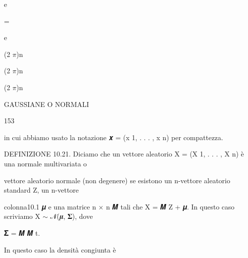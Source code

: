 \documentclass[a4paper,portrait,12pt]{article}
\begin{document}
\begin{flushleft}
e
\end{flushleft}


=


\begin{flushleft}
e
\end{flushleft}


\begin{flushleft}
(2 $\pi$)n
\end{flushleft}


\begin{flushleft}
(2 $\pi$)n
\end{flushleft}


\begin{flushleft}
(2 $\pi$)n
\end{flushleft}





\begin{flushleft}
 GAUSSIANE O NORMALI
\end{flushleft}





153





\begin{flushleft}
in cui abbiamo usato la notazione 𝒙 = (x 1, . . . , x n) per compattezza.
\end{flushleft}


\begin{flushleft}
DEFINIZIONE 10.21. Diciamo che un vettore aleatorio X = (X 1, . . . , X n) \`{e} una normale multivariata o
\end{flushleft}


\begin{flushleft}
vettore aleatorio normale (non degenere) se esistono un n-vettore aleatorio standard Z, un n-vettore
\end{flushleft}


\begin{flushleft}
colonna10.1 𝝁 e una matrice n × n 𝑴 tali che X = 𝑴 Z + 𝝁. In questo caso scriviamo X $\sim$ 𝒩(𝝁, 𝚺), dove
\end{flushleft}


\begin{flushleft}
𝚺 = 𝑴 𝑴 t.
\end{flushleft}


\begin{flushleft}
In questo caso la densit\`{a} congiunta \`{e}
\end{flushleft}
\end{document}
